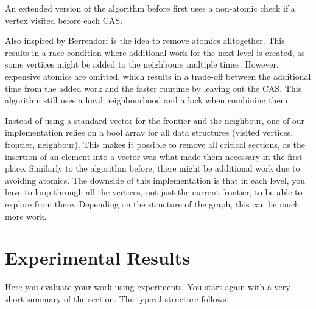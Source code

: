 \documentclass[letterpaper]{article}
\begin{document}
	An extended version of the algorithm before first uses a non-atomic check if a vertex visited before each CAS.
	
	Also inspired by Berrendorf \cite{Berrendorf:14} is the idea to remove atomics alltogether. This results in a race condition where additional work for the next level is created, as some vertices might be added to the neighbours multiple times. However, expensive atomics are omitted, which results in a trade-off between the additional time from the added work and the faster runtime by leaving out the CAS. This algorithm still uses a local neighbourhood and a lock when combining them.
	
	Instead of using a standard vector for the frontier and the neighbour, one of our implementation relies on a bool array for all data structures (visited vertices, frontier, neighbour). This makes it possible to remove all critical sections, as the insertion of an element into a vector was what made them necessary in the first place. Similarly to the algorithm before, there might be additional work due to avoiding atomics. The downside of this implementation is that in each level, you have to loop through all the vertices, not just the current frontier, to be able to explore from there. Depending on the structure of the graph, this can be much more work.
	
	
	
	
	
	
	\section{Experimental Results}\label{sec:exp}
	
	Here you evaluate your work using experiments. You start again with a
	very short summary of the section. The typical structure follows.
	
\end{document}
